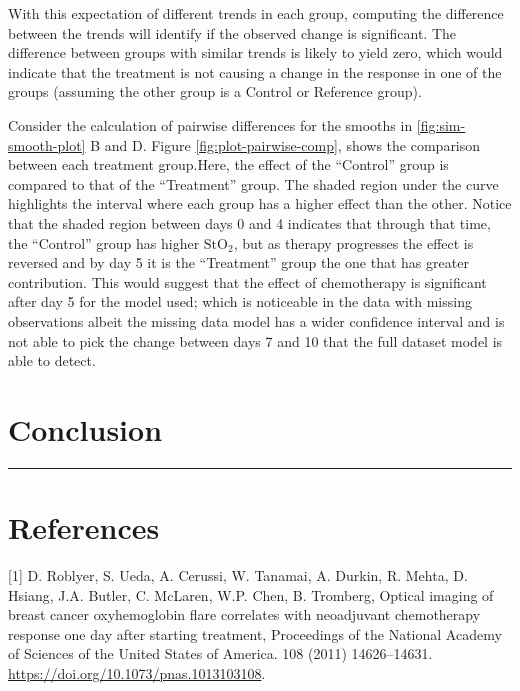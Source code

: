 \documentclass[
]{article}
\begin{document}
With this expectation of different trends in each group, computing the difference between the trends will identify if the observed change is significant. The difference between groups with similar trends is likely to yield zero, which would indicate that the treatment is not causing a change in the response in one of the groups (assuming the other group is a Control or Reference group).

Consider the calculation of pairwise differences for the smooths in \ref{fig:sim-smooth-plot} B and D. Figure \ref{fig:plot-pairwise-comp}, shows the comparison between each treatment group.Here, the effect of the ``Control'' group is compared to that of the ``Treatment'' group. The shaded region under the curve highlights the interval where each group has a higher effect than the other. Notice that the shaded region between days 0 and 4 indicates that through that time, the ``Control'' group has higher \(\mbox{StO}_2\), but as therapy progresses the effect is reversed and by day 5 it is the ``Treatment'' group the one that has greater contribution. This would suggest that the effect of chemotherapy is significant after day 5 for the model used; which is noticeable in the data with missing observations albeit the missing data model has a wider confidence interval and is not able to pick the change between days 7 and 10 that the full dataset model is able to detect.

\FloatBarrier

\hypertarget{conclusion}{%
\section{Conclusion}\label{conclusion}}

\FloatBarrier

\begin{center}\rule{0.5\linewidth}{0.5pt}\end{center}

\newpage

\hypertarget{references}{%
\section{References}\label{references}}

\hypertarget{refs}{}
\leavevmode\hypertarget{ref-roblyer2011}{}%
{[}1{]} D. Roblyer, S. Ueda, A. Cerussi, W. Tanamai, A. Durkin, R. Mehta, D. Hsiang, J.A. Butler, C. McLaren, W.P. Chen, B. Tromberg, Optical imaging of breast cancer oxyhemoglobin flare correlates with neoadjuvant chemotherapy response one day after starting treatment, Proceedings of the National Academy of Sciences of the United States of America. 108 (2011) 14626--14631. \url{https://doi.org/10.1073/pnas.1013103108}.
\end{document}
